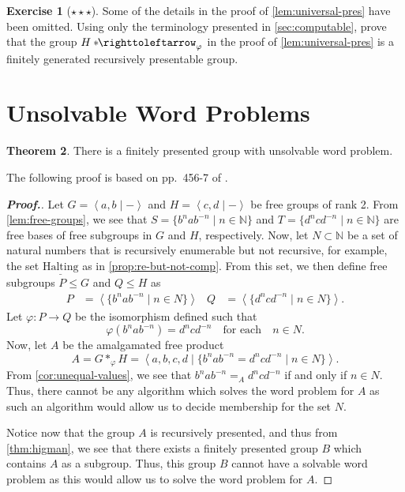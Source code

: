 \documentclass[11pt,a4paper,reqno]{amsart}
\theoremstyle{plain}
\theoremstyle{definition}
\newtheorem{theorem}{Theorem}[section]
\theoremstyle{definition}
\newtheorem{exercise}[theorem]{Exercise}
\renewcommand\leq\leqslant
\newenvironment{myproof}{\begin{proof}[\normalfont\bfseries Proof.]}{\end{proof}}
\newcommand\hnn{*\!\!\righttoleftarrow}
\newcommand\exerciseLevelHard{$\star${\,}$\star${\,}$\star$}
\begin{document}
\begin{exercise}[\exerciseLevelHard]
	Some of the details in the proof of \cref{lem:universal-pres} have been omitted.
	Using only the terminology presented in \cref{sec:computable}, prove that the group $H\hnn_\varphi$ in the proof of \cref{lem:universal-pres} is a finitely generated recursively presentable group.
\end{exercise}

\section{Unsolvable Word Problems}

\begin{theorem}\label{thm:unsolvable-wp}
	There is a finitely presented group with unsolvable word problem.
\end{theorem}

\smallskip
The following proof is based on pp.~456-7 of \cite{higman1961}.

\begin{myproof}
	Let $G = \left\langle a,b \mid - \right\rangle$ and $H = \left\langle c,d \mid - \right\rangle$ be free groups of rank 2.
	From \cref{lem:free-groups}, we see that $S = \{ b^n a b^{-n} \mid n\in \mathbb N \}$ and $T = \{ d^n c d^{-n} \mid n\in \mathbb N \}$ are free bases of free subgroups in $G$ and $H$, respectively.
	Now, let $N\subset \mathbb N$ be a set of natural numbers that is recursively enumerable but not recursive, for example, the set $\underline{\mathrm{Halting}}$ as in \cref{prop:re-but-not-comp}.
	From this set, we then define free subgroups $P\leq G$ and $Q\leq H$ as
	\begin{align*}
		P & = \left\langle \{b^n a b^{-n} \mid n \in N\} \right\rangle  &
		Q & = \left\langle \{d^n c d^{-n} \mid n \in N \}\right\rangle.
	\end{align*}
	Let $\varphi\colon P \to Q$ be the isomorphism defined such that
	\[
		\varphi(b^n a b^{-n}) = d^n c d^{-n}
		\quad\text{for each}\quad n \in N.
	\]
	Now, let $A$ be the amalgamated free product
	\[
		A
		=
		G*_\varphi H
		=
		\left\langle
		a,b,c,d
		\mid
		\{
		b^n a b^{-n}
		=
		d^n c d^{-n}
		\mid
		n \in N
		\}
		\right\rangle.
	\]
	From \cref{cor:unequal-values}, we see that $b^n a b^{-n} =_A d^n c d^{-n}$ if and only if $n \in N$.
	Thus, there cannot be any algorithm which solves the word problem for $A$ as such an algorithm would allow us to decide membership for the set $N$.

	Notice now that the group $A$ is recursively presented, and thus from \cref{thm:higman}, we see that there exists a finitely presented group $B$ which contains $A$ as a subgroup.
	Thus, this group $B$ cannot have a solvable word problem as this would allow us to solve the word problem for $A$.
\end{myproof}
\end{document}
